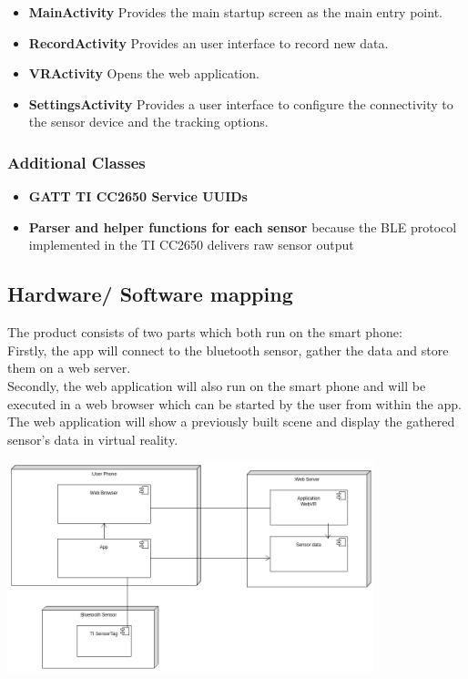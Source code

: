 \begin{itemize}
  \item \textbf{MainActivity} Provides the main startup screen as the main entry point.
  \item \textbf{RecordActivity} Provides an user interface to record new data.
  \item \textbf{VRActivity} Opens the web application.
  \item \textbf{SettingsActivity} Provides a user interface to configure the connectivity to the sensor device and the tracking options.
\end{itemize}

\subsubsection{Additional Classes}
\begin{itemize}
  \item \textbf{GATT TI CC2650 Service UUIDs}
  \item \textbf{Parser and helper functions for each sensor} because the BLE protocol implemented in the TI CC2650 delivers raw sensor output
\end{itemize}

\subsection{Hardware/ Software mapping}

The product consists of two parts which both run on the smart phone: \\
Firstly, the app will connect to the bluetooth sensor, gather the data and store them on a web server. \\
Secondly, the web application will also run on the smart phone and will be executed in a web browser which can be started by the user from within the app. The web application will show a previously built scene and display the gathered sensor's data in virtual reality.

\includegraphics[width=0.8\textwidth]{diagramms/hsMapping.png}

